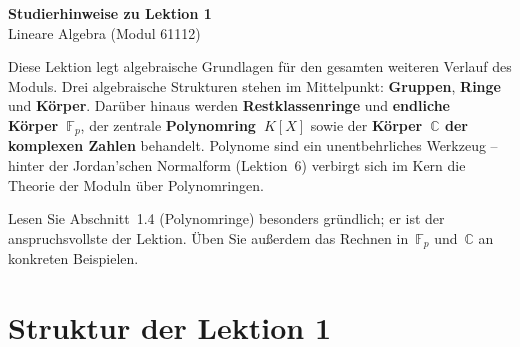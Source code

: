 \documentclass[a4paper,12pt]{article}
\begin{document}
\begin{center}
  {\LARGE\bfseries Studierhinweise zu Lektion 1}\\[0.5em]
  {\large Lineare Algebra (Modul 61112)}
\end{center}

\vspace{0.8em}

Diese Lektion legt algebraische Grundlagen für den gesamten weiteren Verlauf des Moduls. Drei
algebraische Strukturen stehen im Mittelpunkt: \textbf{Gruppen}, \textbf{Ringe} und \textbf{Körper}. Darüber
hinaus werden \textbf{Restklassenringe} und \textbf{endliche Körper~$\mathbb{F}_p$}, der zentrale \textbf{Polynomring~$K[X]$} sowie
der \textbf{Körper~$\mathbb{C}$ der komplexen Zahlen} behandelt. Polynome sind ein unentbehrliches
Werkzeug -- hinter der Jordan'schen Normalform (Lektion~6) verbirgt sich im Kern die
Theorie der Moduln über Polynomringen.

Lesen Sie Abschnitt~1.4 (Polynomringe) besonders gründlich; er ist der anspruchsvollste der
Lektion. Üben Sie außerdem das Rechnen in~$\mathbb{F}_p$ und~$\mathbb{C}$ an konkreten Beispielen.

\section*{Struktur der Lektion 1}

\begin{center}
\end{center}
\end{document}
